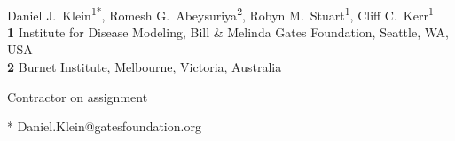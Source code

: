 \documentclass[10pt,letterpaper]{article}
\begin{document}
\vspace*{0.2in}

\begin{flushleft}
{\Large
\textbf{} %
}
\newline
\\
Daniel J.~Klein\textsuperscript{1*},
Romesh G.~Abeysuriya\textsuperscript{2},
Robyn M.~Stuart\textsuperscript{1\ddag},
Cliff C.~Kerr\textsuperscript{1}
\\
\bigskip
\textbf{1} Institute for Disease Modeling, Bill \& Melinda Gates Foundation, Seattle, WA, USA
\\
\textbf{2} Burnet Institute, Melbourne, Victoria, Australia
\\
\bigskip

% 
%

\ddag Contractor on assignment




* Daniel.Klein@gatesfoundation.org

\end{flushleft}
\end{document}
